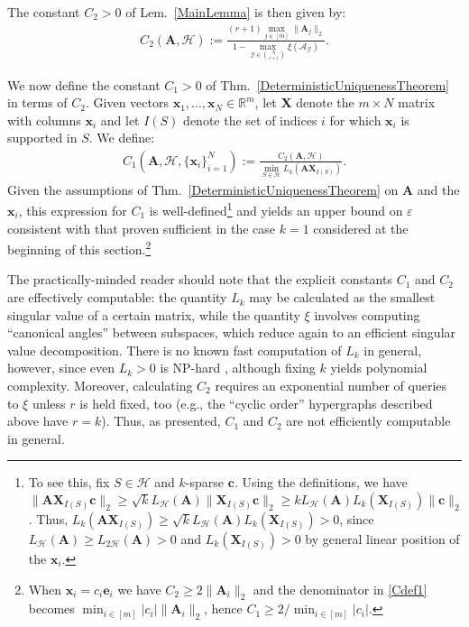 \documentclass[journal, twocolumn]{IEEEtran}
\begin{document}
The constant $C_2 > 0$ of Lem.~\ref{MainLemma} is then given by:  
\begin{align}\label{Cdef2}
	C_2(\mathbf{A}, \mathcal{H}) := \frac{ (r+1) \max_{j \in [m]} \|\mathbf{A}_j\|_2}{ 1- \max_{\mathcal{G} \in {\mathcal{H} \choose r+1}} \xi( \bm{\mathcal{A}}_\mathcal{G} ) }.
\end{align}

We now define the constant $C_1 > 0$ of Thm.~\ref{DeterministicUniquenessTheorem} in terms of $C_2$. Given vectors $\mathbf{x}_1, \ldots, \mathbf{x}_N \in \mathbb{R}^m$, let $\mathbf{X}$ denote the $m \times N$ matrix with columns $\mathbf{x}_i$ and let $I(S)$ denote the set of indices $i$ for which $\mathbf{x}_i$ is supported in $S$.  We define:
\begin{align}\label{Cdef1}
C_1(\mathbf{A}, \mathcal{H}, \{\mathbf{x}_i\}_{i=1}^N) := \frac{ C_2(\mathbf{A}, \mathcal{H}) } { \min_{S \in \mathcal{H}} L_k(\mathbf{AX}_{I(S)}) }.
\end{align}
Given the assumptions of Thm.~\ref{DeterministicUniquenessTheorem} on $\mathbf{A}$ and the $\mathbf{x}_i$, this expression for $C_1$ is well-defined\footnote{\label{note1}To see this, fix $S \in \mathcal{H}$ and $k$-sparse $\mathbf{c}$. Using the definitions, we have $\|\mathbf{AX}_{I(S)}\mathbf{c}\|_2 \geq \sqrt{k} L_\mathcal{H}(\mathbf{A})\|\mathbf{X}_{I(S)}\mathbf{c}\|_2 \geq k L_\mathcal{H}(\mathbf{A}) L_k(\mathbf{X}_{I(S)})\|\mathbf{c}\|_2$. Thus, $L_k(\mathbf{AX}_{I(S)}) \geq \sqrt{k} L_\mathcal{H}(\mathbf{A}) L_k(\mathbf{X}_{I(S)}) > 0$, since $L_{\mathcal{H}}(\mathbf{A}) \geq L_{2\mathcal{H}}(\mathbf{A})> 0$ and $L_k(\mathbf{X}_{I(S)}) > 0$ by general linear position of the $\mathbf{x}_i$.} and yields an upper bound on $\varepsilon$ consistent with that proven sufficient in the case $k=1$ considered at the beginning of this section.\footnote{When $\mathbf{x}_i = c_i\mathbf{e}_i$ we have $C_2 \geq 2\|\mathbf{A}_i\|_2$ and the denominator in \eqref{Cdef1} becomes $\min_{i \in [m]} |c_i| \|\mathbf{A}_i\|_2$, hence $C_1 \geq 2 / \min_{i \in [m]} |c_i|$.}


The practically-minded reader should note that the explicit constants $C_1$ and $C_2$ are effectively computable: the quantity $L_k$ may be calculated as the smallest singular value of a certain matrix, while the quantity $\xi$ involves computing ``canonical angles'' between subspaces, which reduce again to an efficient singular value decomposition. There is no known fast computation of $L_k$ in general, however, since even $L_{k} > 0$ is NP-hard \cite{tillmann2014computational}, although 
fixing $k$ yields polynomial complexity. Moreover, calculating $C_2$ requires an exponential number of queries to $\xi$ unless $r$ is held fixed, too (e.g., the ``cyclic order'' hypergraphs described above have $r=k$).  Thus, as presented, $C_1$ and $C_2$ are not efficiently computable in general.  %
\end{document}
